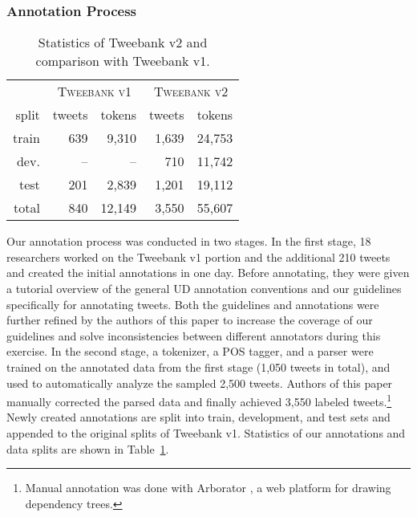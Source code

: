 \documentclass[11pt,a4paper]{article}
\begin{document}
\subsubsection{Annotation Process}
\begin{table}
	\centering
	\begin{tabular}{rrrrr}
& \multicolumn{2}{c}{\textsc{Tweebank v1}} & \multicolumn{2}{c}{\textsc{Tweebank v2}} \\
		split & tweets & tokens & tweets & tokens \\
		\hline
		train & 639 & 9,310 & 1,639 & 24,753 \\
		dev. & --\hphantom{0} & --\hphantom{00} & 710 & 11,742 \\
		test & 201 & 2,839 & 1,201 & 19,112 \\
		\hline
		total & 840 & 12,149 & 3,550 & 55,607 \\
\end{tabular}

\caption{Statistics of {\sc Tweebank v2} and  comparison with
{\sc Tweebank v1}.
\label{tbl:data-stat}
}
\end{table}
Our annotation process was conducted in two stages.
In the first stage, 18 researchers worked on the {\sc Tweebank v1}
portion and the additional 210 tweets and created the initial annotations in one day.
Before annotating, they were given a tutorial overview of the general UD
annotation conventions and our guidelines specifically for annotating tweets.
Both the guidelines and annotations
were further refined by the authors of this paper to increase
the coverage of our guidelines and solve inconsistencies between
different annotators during this exercise. In the second stage, a tokenizer, a POS tagger, and a
parser were trained on the annotated data from the first stage (1,050 tweets in total),
and used to automatically analyze the sampled 2,500 tweets.  Authors 
of this paper manually corrected the parsed data and finally achieved 3,550 labeled tweets.\footnote{Manual annotation was done with Arborator \cite{gerdes:2013:W13-37}, a web platform for drawing dependency trees.}
Newly created annotations are split into train, development, and test sets and appended
to the original splits of {\sc Tweebank v1}. Statistics of our annotations and data splits are shown
in Table~\ref{tbl:data-stat}.
\end{document}
